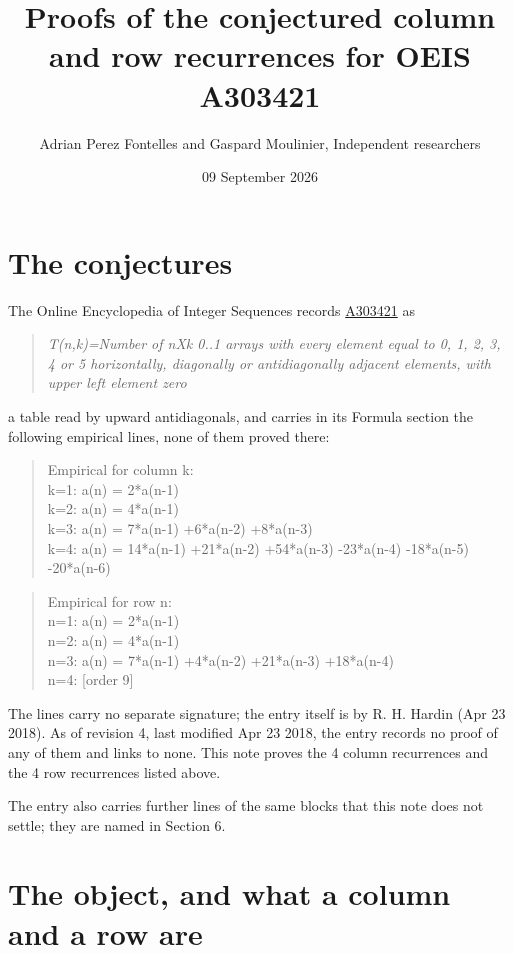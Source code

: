 \documentclass[11pt]{article}
\title{Proofs of the conjectured column and row recurrences for OEIS A303421}
\author{Adrian Perez Fontelles and Gaspard Moulinier, Independent researchers}
\date{09 September 2026}
\theoremstyle{definition}
\begin{document}
\maketitle
\section{The conjectures}

The Online Encyclopedia of Integer Sequences records \href{https://oeis.org/A303421}{A303421} as

\begin{quote}\itshape T(n,k)=Number of nXk 0..1 arrays with every element equal to 0, 1, 2, 3, 4 or 5 horizontally, diagonally or antidiagonally adjacent elements, with upper left element zero\end{quote}

a table read by upward antidiagonals, and carries in its Formula section the following empirical lines, none of them proved there:

\begin{quote}\ttfamily Empirical for column k:\\
k=1: a(n) = 2*a(n-1)\\k=2: a(n) = 4*a(n-1)\\k=3: a(n) = 7*a(n-1) +6*a(n-2) +8*a(n-3)\\k=4: a(n) = 14*a(n-1) +21*a(n-2) +54*a(n-3) -23*a(n-4) -18*a(n-5) -20*a(n-6)\end{quote}

\begin{quote}\ttfamily Empirical for row n:\\
n=1: a(n) = 2*a(n-1)\\n=2: a(n) = 4*a(n-1)\\n=3: a(n) = 7*a(n-1) +4*a(n-2) +21*a(n-3) +18*a(n-4)\\n=4: [order 9]\end{quote}

The lines carry no separate signature; the entry itself is by R. H. Hardin (Apr 23 2018). As of revision 4, last modified Apr 23 2018, the entry records no proof of any of them and links to none. This note proves the 4 column recurrences and the 4 row recurrences listed above.

The entry also carries further lines of the same blocks that this note does not settle; they are named in Section 6.

\section{The object, and what a column and a row are}
\end{document}
